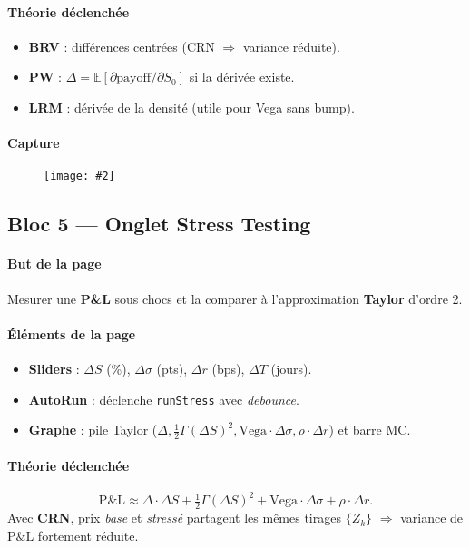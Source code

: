 \documentclass[11pt,a4paper]{article}
\newcommand{\code}[1]{\texttt{#1}}
\newcommand{\imgfull}[2][\textwidth]{\begin{figure}[H]\centering\texttt{[image: \#2]}\end{figure}}
\newcommand{\mc}{\textsc{MC}}
\begin{document}
\paragraph{Théorie déclenchée}
\begin{itemize}[leftmargin=*]
  \item \textbf{BRV} : différences centrées (CRN \(\Rightarrow\) variance réduite).
  \item \textbf{PW} : \(\Delta = \mathbb{E}[\partial \text{payoff}/\partial S_0]\) si la dérivée existe.
  \item \textbf{LRM} : dérivée de la densité (utile pour Vega sans bump).
\end{itemize}

\paragraph{Capture} \imgfull{greeks.png}

\subsection*{Bloc 5 — Onglet Stress Testing}
\paragraph{But de la page} Mesurer une \textbf{P\&L} sous chocs et la comparer à l’approximation \textbf{Taylor} d’ordre 2.

\paragraph{Éléments de la page}
\begin{itemize}[leftmargin=*]
  \item \textbf{Sliders} : \(\Delta S\) (\%), \(\Delta\sigma\) (pts), \(\Delta r\) (bps), \(\Delta T\) (jours).
  \item \textbf{AutoRun} : déclenche \code{runStress} avec \emph{debounce}.
  \item \textbf{Graphe} : pile Taylor (\(\Delta, \frac12\Gamma(\Delta S)^2, \text{Vega}\cdot \Delta\sigma, \rho\cdot\Delta r\)) et barre \mc.
\end{itemize}

\paragraph{Théorie déclenchée}
\[
\mathrm{P\&L} \approx \Delta\cdot \Delta S + \tfrac12 \Gamma (\Delta S)^2 + \text{Vega}\cdot \Delta\sigma + \rho \cdot \Delta r.
\]
Avec \textbf{CRN}, prix \textit{base} et \textit{stressé} partagent les mêmes tirages \(\{Z_k\}\) \(\Rightarrow\) variance de \(\mathrm{P\&L}\) fortement réduite.
\end{document}
